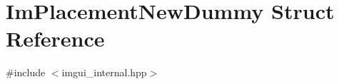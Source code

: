 \hypertarget{struct_im_placement_new_dummy}{}\section{Im\+Placement\+New\+Dummy Struct Reference}
\label{struct_im_placement_new_dummy}


{\ttfamily \#include $<$imgui\+\_\+internal.\+hpp$>$}

